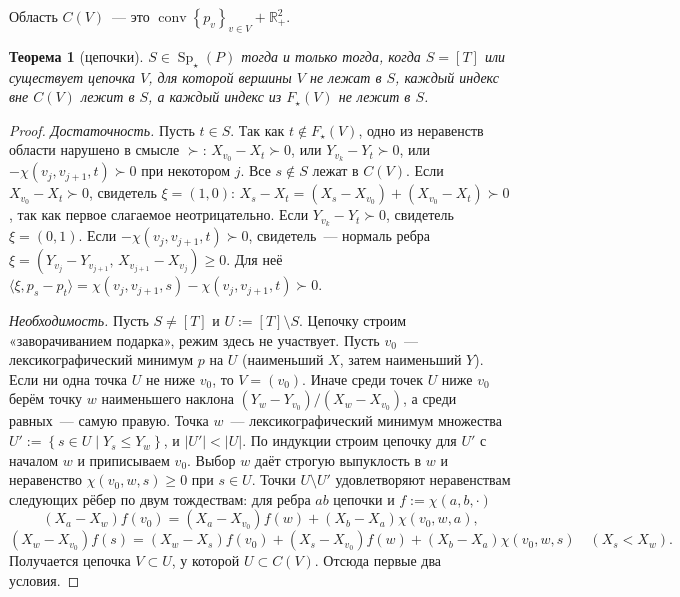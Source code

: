 \documentclass[a4paper,11pt]{article}
\theoremstyle{plain}
\newtheorem{theorem}{Теорема}[section]
\theoremstyle{definition}
\theoremstyle{remark}
\newcommand{\R}{\mathbb{R}}
\newcommand{\abs}[1]{\left\lvert #1 \right\rvert}
\newcommand{\set}[1]{\left\{ #1 \right\}}
\newcommand{\ip}[2]{\langle #1, #2\rangle}
\newcommand{\Rp}[1][2]{\R^{#1}_{+}}
\DeclareMathOperator{\conv}{conv}
\DeclareMathOperator{\Sp}{Sp}
\newcommand{\Spm}{\Sp_\star}
\newcommand{\gs}{\mathrel{\succ}}
\begin{document}
Область $C(V)$~--- это $\conv\set{p_v}_{v\in V}+\Rp$.

\begin{theorem}[цепочки]\label{thm:chain}
    $S\in\Spm(P)$ тогда и только тогда, когда $S=[T]$ или существует цепочка $V$, для которой вершины $V$ не лежат в $S$, каждый индекс вне $C(V)$ лежит в $S$, а каждый индекс из $F_\star(V)$ не лежит в $S$.
\end{theorem}

\begin{proof}
    \emph{Достаточность.} Пусть $t\in S$. Так как $t\notin F_\star(V)$, одно из неравенств области нарушено в смысле $\gs$: $X_{v_0}-X_t\gs0$, или $Y_{v_k}-Y_t\gs0$, или $-\chi(v_j,v_{j+1},t)\gs0$ при некотором $j$. Все $s\notin S$ лежат в $C(V)$. Если $X_{v_0}-X_t\gs0$, свидетель $\xi=(1,0)$: $X_s-X_t=(X_s-X_{v_0})+(X_{v_0}-X_t)\gs0$, так как первое слагаемое неотрицательно. Если $Y_{v_k}-Y_t\gs0$, свидетель $\xi=(0,1)$. Если $-\chi(v_j,v_{j+1},t)\gs0$, свидетель~--- нормаль ребра $\xi=(Y_{v_j}-Y_{v_{j+1}},\,X_{v_{j+1}}-X_{v_j})\ge0$. Для неё $\ip{\xi}{p_s-p_t}=\chi(v_j,v_{j+1},s)-\chi(v_j,v_{j+1},t)\gs0$.

    \emph{Необходимость.} Пусть $S\ne[T]$ и $U:=[T]\setminus S$. Цепочку строим «заворачиванием подарка», режим здесь не участвует. Пусть $v_0$~--- лексикографический минимум $p$ на $U$ (наименьший $X$, затем наименьший $Y$). Если ни одна точка $U$ не ниже $v_0$, то $V=(v_0)$. Иначе среди точек $U$ ниже $v_0$ берём точку $w$ наименьшего наклона $(Y_w-Y_{v_0})/(X_w-X_{v_0})$, а среди равных~--- самую правую. Точка $w$~--- лексикографический минимум множества $U':=\set{s\in U\mid Y_s\le Y_w}$, и $\abs{U'}<\abs U$. По индукции строим цепочку для $U'$ с началом $w$ и приписываем $v_0$. Выбор $w$ даёт строгую выпуклость в $w$ и неравенство $\chi(v_0,w,s)\ge0$ при $s\in U$. Точки $U\setminus U'$ удовлетворяют неравенствам следующих рёбер по двум тождествам: для ребра $ab$ цепочки и $f:=\chi(a,b,\cdot)$
    \[
        (X_a-X_w)f(v_0)=(X_a-X_{v_0})f(w)+(X_b-X_a)\chi(v_0,w,a),
    \]
    \[
        (X_w-X_{v_0})f(s)=(X_w-X_s)f(v_0)+(X_s-X_{v_0})f(w)+(X_b-X_a)\chi(v_0,w,s)\quad(X_s<X_w).
    \]
    Получается цепочка $V\subset U$, у которой $U\subset C(V)$. Отсюда первые два условия.


\end{proof}
\end{document}
